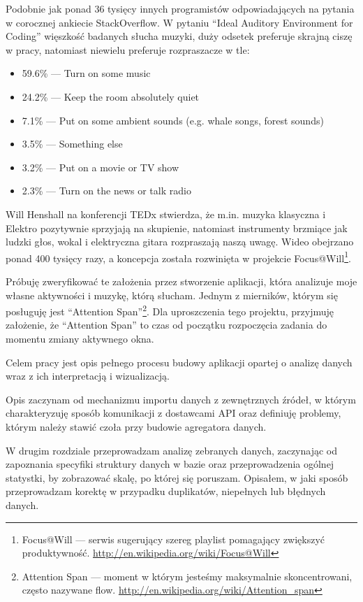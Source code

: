 \documentclass[openright]{xmgr}
\begin{document}
    Podobnie jak ponad 36 tysięcy innych programistów odpowiadających na pytania w corocznej ankiecie StackOverflow\cite{stackoverflow:survey2017}.
    W pytaniu ``Ideal Auditory Environment for Coding''
    więszkość badanych słucha muzyki, duży odsetek preferuje skrajną ciszę w pracy, natomiast niewielu preferuje rozpraszacze w tle:
    \begin{itemize}
        \item 59.6\% --- Turn on some music
        \item 24.2\% --- Keep the room absolutely quiet
        \item 7.1\% --- Put on some ambient sounds (e.g. whale songs, forest sounds)
        \item 3.5\% --- Something else
        \item 3.2\% --- Put on a movie or TV show
        \item 2.3\% --- Turn on the news or talk radio
    \end{itemize}

    Will Henshall na konferencji TEDx\cite{tedx:music-at-work} stwierdza, że m.in. muzyka klasyczna i Elektro pozytywnie sprzyjają na skupienie,
    natomiast instrumenty brzmiące jak ludzki głos, wokal i elektryczna gitara rozpraszają naszą uwagę.
    Wideo obejrzano ponad 400 tysięcy razy, a koncepcja została rozwinięta w projekcie
    Focus@Will\footnote{Focus@Will --- serwis sugerujący szereg playlist pomagający zwiększyć produktywność. \url{http://en.wikipedia.org/wiki/Focus@Will}}.

    Próbuję zweryfikować te założenia przez stworzenie aplikacji, która analizuje moje własne aktywności i muzykę, którą słucham.
    Jednym z mierników, którym się posługuję jest
    ``Attention Span''\footnote{Attention Span --- moment w którym jesteśmy maksymalnie skoncentrowani,
    często nazywane flow. \url{http://en.wikipedia.org/wiki/Attention_span}}.
    Dla uproszczenia tego projektu, przyjmuję założenie, że ``Attention Span'' to czas od początku rozpoczęcia zadania do momentu zmiany aktywnego okna.

    Celem pracy jest opis pełnego procesu budowy aplikacji opartej o analizę danych wraz z ich interpretacją i wizualizacją.

    Opis zaczynam od mechanizmu importu danych z zewnętrznych źródeł, w którym charakteryzuję sposób komunikacji z dostawcami API
    oraz definiuję problemy, którym należy stawić czoła przy budowie agregatora danych.

    W drugim rozdziale przeprowadzam analizę zebranych danych, zaczynając od zapoznania specyfiki struktury danych w bazie
    oraz przeprowadzenia ogólnej statystki, by zobrazować skalę, po której się poruszam.
    Opisałem, w jaki sposób przeprowadzam korektę w przypadku duplikatów, niepełnych lub błędnych danych.
\end{document}
